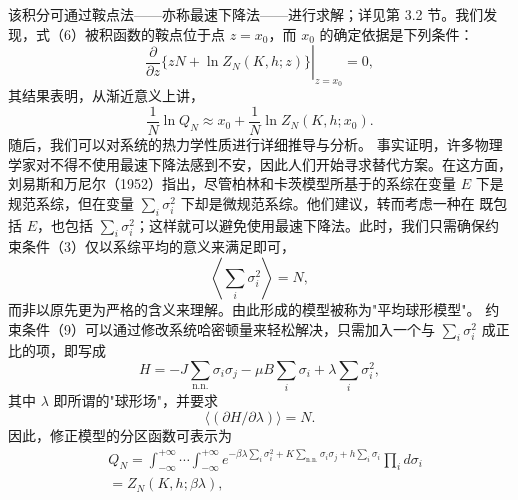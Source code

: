 该积分可通过鞍点法——亦称最速下降法——进行求解；详见第 3.2 节。我们发现，式（6）被积函数的鞍点位于点 \(z = x_0\)，而 \(x_0\) 的确定依据是下列条件：
\begin{equation}\tag{13.4.36}\label{eq:13.4.36}
\left. \frac { \partial } { \partial z } \{ z N + \ln Z _ { N } ( K , h ; z ) \} \right| _ { z = x _ { 0 } } = 0 ,
\end{equation}
其结果表明，从渐近意义上讲，
\begin{equation}\tag{13.4.37}\label{eq:13.4.37}
\frac { 1 } { N } \ln Q _ { N } \approx x _ { 0 } + \frac { 1 } { N } \ln Z _ { N } ( K , h ; x _ { 0 } ) .
\end{equation}
随后，我们可以对系统的热力学性质进行详细推导与分析。
事实证明，许多物理学家对不得不使用最速下降法感到不安，因此人们开始寻求替代方案。在这方面，刘易斯和万尼尔（1952）指出，尽管柏林和卡茨模型所基于的系综在变量 \(E\) 下是规范系综，但在变量 \(\sum_{i} \sigma_{i}^{2}\) 下却是微规范系综。他们建议，转而考虑一种在
既包括 \(E\)，也包括 \(\sum_{i} \sigma_{i}^{2}\)；这样就可以避免使用最速下降法。此时，我们只需确保约束条件（3）仅以系综平均的意义来满足即可，
\begin{equation}\tag{13.4.38}\label{eq:13.4.38}
\left\langle \sum _ { i } \sigma _ { i } ^{2} \right\rangle = N ,
\end{equation}
而非以原先更为严格的含义来理解。由此形成的模型被称为"平均球形模型"。
约束条件（9）可以通过修改系统哈密顿量来轻松解决，只需加入一个与 \(\sum_{i} \sigma_{i}^{2}\) 成正比的项，即写成
\begin{equation}\tag{13.4.39}\label{eq:13.4.39}
H = - J \sum _ { \mathrm { n . n . } } \sigma _ { i } \sigma _ { j } - \mu B \sum _ { i } \sigma _ { i } + \lambda \sum _ { i } \sigma _ { i } ^{2} ,
\end{equation}
其中 \(\lambda\) 即所谓的"球形场"，并要求
\begin{equation}\tag{13.4.40}\label{eq:13.4.40}
\langle ( \partial H / \partial \lambda ) \rangle = N .
\end{equation}
因此，修正模型的分区函数可表示为
\begin{equation}\tag{13.4.41}\label{eq:13.4.41}
\begin{array}{rl} & { Q _ { N } = \displaystyle \int _ { - \infty } ^{+ \infty} \cdots \displaystyle \int _ { - \infty } ^{+ \infty} e ^{- \beta \lambda \sum _ { i} \sigma _ { i } ^{2} + K \sum _ { \mathrm { n . n . } } \sigma _ { i } \sigma _ { j } + h \sum _ { i } \sigma _ { i } } \prod _ { i } d \sigma _ { i } } \\& { = Z _ { N } ( K , h ; \beta \lambda ) , } \end{array}
\end{equation}
